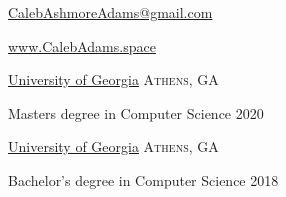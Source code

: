 \documentclass[10pt,a4paper]{article}
\begin{document}
\sloppy  %



\nobreakvspace{0.6em}  %

\href{mailto:CalebAshmoreAdams@gmail.com}{CalebAshmoreAdams\mbox{}@\mbox{}gmail.com}

\href{http://calebadams.space}{www.CalebAdams.space}
\\

\spacedhrule{0.5em}{-0.4em}
\spacedhrule{0.5em}{-0.4em}


\headedsection
  {\href{http://uga.edu}{University of Georgia}}
  {\textsc{Athens, GA}} {%
  \headedsubsection
    {Masters degree in Computer Science}
    {2020}
    {\bodytext{}}

  }
\headedsection
  {\href{http://uga.edu}{University of Georgia}}
  {\textsc{Athens, GA}} {%
  \headedsubsection
    {Bachelor's degree in Computer Science}
    {2018}
    {\bodytext{}}

  }



\spacedhrule{0em}{-0.4em}
\end{document}
